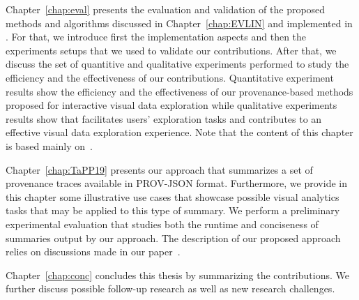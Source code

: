 \bigskip Chapter~\ref{chap:eval} presents the evaluation and validation of the proposed methods
and algorithms discussed in Chapter~\ref{chap:EVLIN} and implemented in \prototype{}. %
For that, we introduce first the implementation aspects and then the experiments setups that we used to validate our contributions. After that, we discuss the set of quantitive and qualitative experiments performed to study the efficiency and the effectiveness of our contributions.
Quantitative experiment results show the efficiency and the effectiveness of our provenance-based methods proposed for interactive visual data exploration while qualitative experiments results show that \prototype{} facilitates users' exploration tasks and contributes to an effective visual data exploration experience.
Note that the content of this chapter is based mainly on~\cite{Houssem:17:tapp,Houssem:19:adbis,Houssem:19:IS}.



\bigskip Chapter~\ref{chap:TaPP19} presents our approach that summarizes a set of provenance traces available in PROV-JSON format. 
Furthermore, we provide in this chapter some illustrative use cases that showcase possible visual analytics tasks that may be applied to this type of summary. We perform a preliminary experimental evaluation that studies both the runtime and conciseness of summaries output by our approach. 
The description of our proposed approach relies on discussions made in our paper~\cite{Houssem:19:TaPP}.

\bigskip Chapter~\ref{chap:conc} concludes this thesis by summarizing the contributions. We further discuss possible follow-up research as well as new research challenges.



